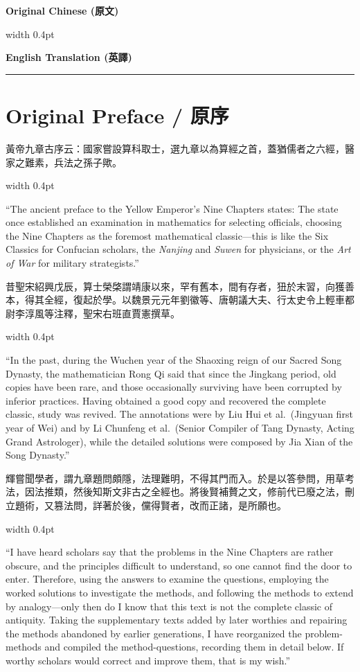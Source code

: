 \documentclass[10pt,a4paper]{article}
\newcommand{\zh}[1]{{\CJKfamily{notocjksc}#1}}
\newcommand{\bilingual}[2]{%
  \par\smallskip\noindent%
  \begin{minipage}[t]{0.47\textwidth}%
    \RaggedRight\small #1%
  \end{minipage}%
  \hfill\vrule width 0.4pt\hfill%
  \begin{minipage}[t]{0.47\textwidth}%
    \RaggedRight\small #2%
  \end{minipage}%
  \par\smallskip%
}
\newcommand{\colheaders}{%
  \noindent
  \begin{minipage}[t]{0.47\textwidth}%
    \centering\textbf{\small\color{sectioncolor}Original Chinese (原文)}%
  \end{minipage}%
  \hfill\vrule width 0.4pt\hfill
  \begin{minipage}[t]{0.47\textwidth}%
    \centering\textbf{\small\color{sectioncolor}English Translation (英譯)}%
  \end{minipage}%
  \par\vspace{0.5em}%
  \noindent\rule{\textwidth}{0.6pt}\par\vspace{0.5em}%
}
\begin{document}
\newpage
\colheaders

\section{Original Preface / 原序}

\bilingual{
  \zh{黃帝九章古序云：國家嘗設算科取士，選九章以為算經之首，蓋猶儒者之六經，醫家之難素，兵法之孫子歟。}
}{%
  ``The ancient preface to the Yellow Emperor's Nine Chapters states: The state once established an examination in mathematics for selecting officials, choosing the Nine Chapters as the foremost mathematical classic---this is like the Six Classics for Confucian scholars, the \textit{Nanjing} and \textit{Suwen} for physicians, or the \textit{Art of War} for military strategists.''
}

\bilingual{
  \zh{昔聖宋紹興戊辰，算士榮棨謂靖康以來，罕有舊本，間有存者，狃於末習，向獲善本，得其全經，復起於學。以魏景元元年劉徽等、唐朝議大夫、行太史令上輕車都尉李淳風等注釋，聖宋右班直賈憲撰草。}
}{%
  ``In the past, during the Wuchen year of the Shaoxing reign of our Sacred Song Dynasty, the mathematician Rong Qi said that since the Jingkang period, old copies have been rare, and those occasionally surviving have been corrupted by inferior practices. Having obtained a good copy and recovered the complete classic, study was revived. The annotations were by Liu Hui et al.\ (Jingyuan first year of Wei) and by Li Chunfeng et al.\ (Senior Compiler of Tang Dynasty, Acting Grand Astrologer), while the detailed solutions were composed by Jia Xian of the Song Dynasty.''
}

\bilingual{
  \zh{輝嘗聞學者，謂九章題問頗隱，法理難明，不得其門而入。於是以答參問，用草考法，因法推類，然後知斯文非古之全經也。將後賢補贅之文，修前代已廢之法，刪立題術，又篡法問，詳著於後，儻得賢者，改而正諸，是所願也。}
}{%
  ``I have heard scholars say that the problems in the Nine Chapters are rather obscure, and the principles difficult to understand, so one cannot find the door to enter. Therefore, using the answers to examine the questions, employing the worked solutions to investigate the methods, and following the methods to extend by analogy---only then do I know that this text is not the complete classic of antiquity. Taking the supplementary texts added by later worthies and repairing the methods abandoned by earlier generations, I have reorganized the problem-methods and compiled the method-questions, recording them in detail below. If worthy scholars would correct and improve them, that is my wish.''
}
\end{document}

